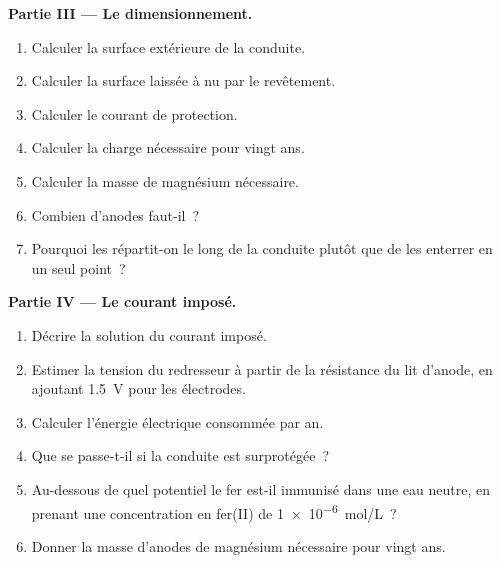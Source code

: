\begin{problem}
\medskip
\noindent\textbf{Partie III --- Le dimensionnement.}
\begin{enumerate}[resume]
  \item Calculer la surface extérieure de la conduite.
  \item Calculer la surface laissée à nu par le revêtement.
  \item Calculer le courant de protection.
  \item Calculer la charge nécessaire pour vingt ans.
  \item Calculer la masse de magnésium nécessaire.
  \item Combien d'anodes faut-il~?
  \item Pourquoi les répartit-on le long de la conduite plutôt que de les enterrer en un
        seul point~?
\end{enumerate}

\medskip
\noindent\textbf{Partie IV --- Le courant imposé.}
\begin{enumerate}[resume]
  \item Décrire la solution du courant imposé.
  \item Estimer la tension du redresseur à partir de la résistance du lit d'anode,
        en ajoutant \qty{1.5}{V} pour les électrodes.
  \item Calculer l'énergie électrique consommée par an.
  \item Que se passe-t-il si la conduite est surprotégée~?
  \item Au-dessous de quel potentiel le fer est-il immunisé dans une eau neutre, en prenant une
        concentration en fer(II) de \qty{1e-6}{mol/L}~?
  \item Donner la masse d'anodes de magnésium nécessaire pour vingt ans.
\end{enumerate}
\end{problem}
